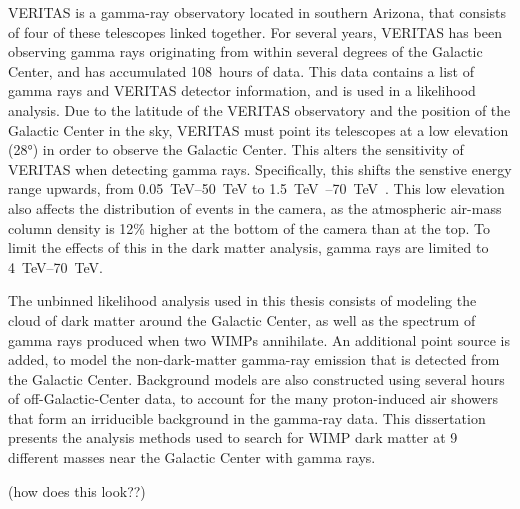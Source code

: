 VERITAS is a gamma-ray observatory located in southern Arizona, that consists of four of these telescopes linked together.
For several years, VERITAS has been observing gamma rays originating from within several degrees of the Galactic Center, and has accumulated \SI{108}{hours} of data.
This data contains a list of gamma rays and VERITAS detector information, and is used in a likelihood analysis.
Due to the latitude of the VERITAS observatory and the position of the Galactic Center in the sky, VERITAS must point its telescopes at a low elevation (\nicetilde\ang{28}) in order to observe the Galactic Center.
This alters the sensitivity of VERITAS when detecting gamma rays.
Specifically, this shifts the senstive energy range upwards, from \SIrange{0.05}{50}{\TeV} to \SIrange{1.5}{70}{\TeV{}}.
This low elevation also affects the distribution of events in the camera, as the atmospheric air-mass column density is 12\% higher at the bottom of the camera than at the top.
To limit the effects of this in the dark matter analysis, gamma rays are limited to \SIrange{4}{70}{\TeV}.

The unbinned likelihood analysis used in this thesis consists of modeling the cloud of dark matter around the Galactic Center, as well as the spectrum of gamma rays produced when two WIMPs annihilate.
An additional point source is added, to model the non-dark-matter gamma-ray emission that is detected from the Galactic Center.
Background models are also constructed using several hours of off-Galactic-Center data, to account for the many proton-induced air showers that form an irriducible background in the gamma-ray data.
This dissertation presents the analysis methods used to search for WIMP dark matter at 9 different masses near the Galactic Center with \TeV{} gamma rays.

{\color{red}(how does this look??)}


\cleartoevenpage[\thispagestyle{plain}]
\null
